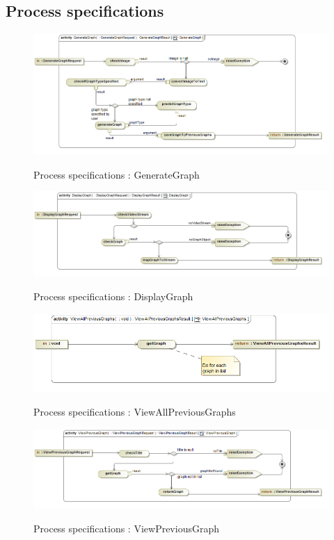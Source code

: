 \documentclass[a4paper,12pt]{article}
\begin{document}
\subsection{Process specifications}
	\begin{figure}[H]
		\includegraphics[width=\textwidth]{Images/act__GenerateGraph__GenerateGraph.png}  \\
		\caption{Process specifications : GenerateGraph}
	\end{figure}
	\begin{figure}[H]
		\includegraphics[width=\textwidth]{Images/act__DisplayGraph__DisplayGraph.png}  \\
		\caption{Process specifications : DisplayGraph}
	\end{figure}
	\begin{figure}[H]
		\includegraphics[width=\textwidth]{Images/act__ViewAllPreviousGraphs__ViewAllPreviousGraphs.png}  \\
		\caption{Process specifications : ViewAllPreviousGraphs}
	\end{figure}
	\begin{figure}[H]
		\includegraphics[width=\textwidth]{Images/act__ViewPreviousGraph__ViewPreviousGraph.png}  \\
		\caption{Process specifications : ViewPreviousGraph}
	\end{figure}
\end{document}
